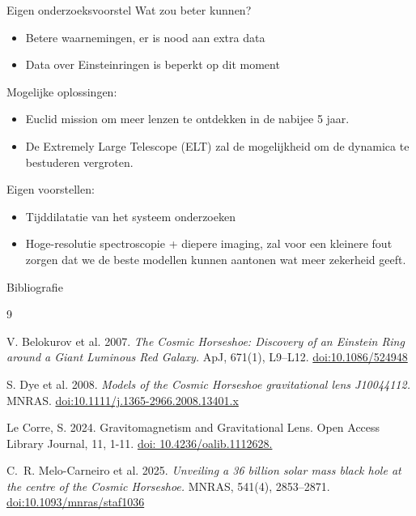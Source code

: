 \documentclass[aspectratio=169,xcolor=dvipsnames]{beamer}
\begin{document}
\begin{frame}{Eigen onderzoeksvoorstel}
    Wat zou beter kunnen?
    \begin{itemize}
        \item Betere waarnemingen, er is nood aan extra data
        \item Data over Einsteinringen is beperkt op dit moment

    \end{itemize}

    Mogelijke oplossingen:
    \begin{itemize}
        \item Euclid mission om meer lenzen te ontdekken in de nabijee 5 jaar.
        \item De Extremely Large Telescope (ELT) zal de mogelijkheid om de dynamica te bestuderen vergroten.

    \end{itemize}
    Eigen voorstellen:
    \begin{itemize}
        \item Tijddilatatie van het systeem onderzoeken
        \item Hoge-resolutie spectroscopie + diepere imaging, zal voor een kleinere fout zorgen dat we de beste modellen kunnen aantonen wat meer zekerheid geeft.
    \end{itemize}


\end{frame}


\begin{frame}{Bibliografie}
  \begin{thebibliography}{9}

    V. Belokurov et al. 2007.
    \textit{The Cosmic Horseshoe: Discovery of an Einstein Ring around a Giant Luminous Red Galaxy.}
    ApJ, 671(1), L9–L12.
    \href{https://doi.org/10.1086/524948}{doi:10.1086/524948}

    S. Dye et al. 2008.
    \textit{Models of the Cosmic Horseshoe gravitational lens J10044112.}
    MNRAS.
    \href{https://doi.org/10.1111/j.1365-2966.2008.13401.x}{doi:10.1111/j.1365-2966.2008.13401.x}



    Le Corre, S. 2024. Gravitomagnetism and Gravitational Lens. Open Access Library Journal, 11, 1-11. \href{https://www.scirp.org/journal/paperinformation?paperid=138088}{doi: 10.4236/oalib.1112628.}

    C.~R. Melo-Carneiro et al. 2025.
    \textit{Unveiling a 36 billion solar mass black hole at the centre of the Cosmic Horseshoe.}
    MNRAS, 541(4), 2853–2871.
    \href{https://doi.org/10.1093/mnras/staf1036}{doi:10.1093/mnras/staf1036}




  \end{thebibliography}
\end{frame}
\end{document}
